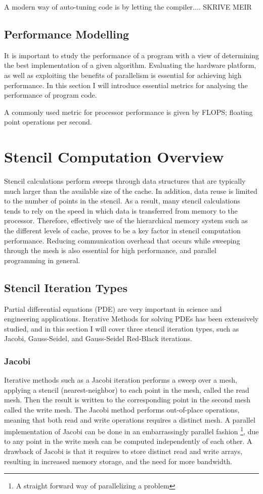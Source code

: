 A modern way of auto-tuning code is by letting the compiler.... SKRIVE MEIR

\subsection{Performance Modelling}
It is important to study the performance of a program with a view of determining the best implementation of a given algorithm. Evaluating the hardware platform, as well as exploiting the benefits of parallelism is essential for achieving high performance. In this section I will introduce essential metrics for analysing the performance of program code.

A commonly used metric for processor performance is given by FLOPS; floating point operations per second. 


\section{Stencil Computation Overview}
Stencil calculations perform sweeps through data structures that are typically much larger than the available size of the cache. In addition, data reuse is limited to the number of points in the stencil. As a result, many stencil calculations tends to rely on the speed in which data is transferred from memory to the processor. Therefore, effectively use of the hierarchical memory system such as the different levels of cache, proves to be a key factor in stencil computation performance. Reducing communication overhead that occurs while sweeping through the mesh is also essential for high performance, and parallel programming in general.

\subsection{Stencil Iteration Types}
\label{subsec:stencil_iteration_types}
Partial differential equations (PDE) are very important in science and engineering applications. Iterative Methods for solving PDEs has been extensively studied, and in this section I will cover three stencil iteration types, such as Jacobi, Gauss-Seidel, and Gauss-Seidel Red-Black iterations.

\subsubsection{Jacobi}
Iterative methods such as a Jacobi iteration performs a sweep over a mesh, applying a stencil (nearest-neighbor) to each point in the mesh, called the read mesh. Then the result is written to the corresponding point in the second mesh called the write mesh. The Jacobi method performs out-of-place operations, meaning that both read and write operations requires a distinct mesh. A parallel implementation of Jacobi can be done in an embarrassingly parallel fashion \footnote{A straight forward way of parallelizing a problem}, due to any point in the write mesh can be computed independently of each other. A drawback of Jacobi is that it requires to store distinct read and write arrays, resulting in increased memory storage, and the need for more bandwidth.

